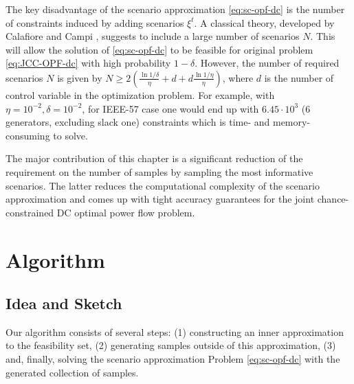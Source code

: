 The key disadvantage of the scenario approximation \eqref{eq:sc-opf-dc} is the number of constraints induced by adding scenarios $\xi^t$. A classical theory, developed by Calafiore and Campi \cite{calafiore2006scenario}, suggests to include a large number of scenarios $N$. This will allow the solution of \eqref{eq:sc-opf-dc} to be feasible for original problem \eqref{eq:JCC-OPF-dc} with high probability $1 - \delta$. However, the number of required scenarios $N$ is given by $N \geq 2 \left( \frac{\ln{1/\delta}}{\eta} + d + d\frac{\ln{1/\eta}}{\eta} \right)$, where $d$ is the number of control variable in the optimization problem. For example, with $\eta = 10^{-2}, \delta = 10^{-2}$, for  IEEE-57 case one would end up with $6.45 \cdot 10^3$ (6 generators, excluding slack one) constraints which is time- and memory-consuming to solve.

The major contribution of this chapter is a significant reduction of the requirement on the number of samples by sampling the most informative scenarios. The latter reduces the computational complexity of the scenario approximation and comes up with tight accuracy guarantees for the joint chance-constrained DC optimal power flow problem. 


\section{Algorithm}\label{sec:algo-dc}

\subsection{Idea and Sketch}
Our algorithm consists of several steps: 
(1) constructing an inner approximation to the feasibility set,
(2) generating samples outside of this approximation,
(3) and, finally, solving the scenario approximation Problem \eqref{eq:sc-opf-dc} with the generated collection of samples.

